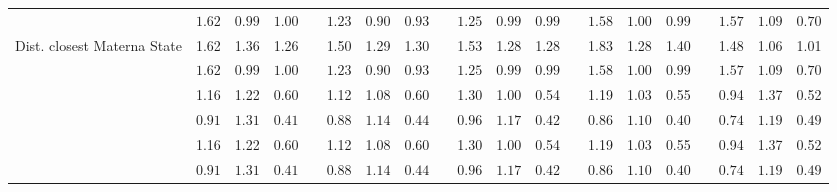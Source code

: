 \begin{center}
{\begin{longtable}{L{5cm} c c c p{.5cm} c c c p{.5cm} c c c p{.5cm} c c c p{.5cm} c c c}
& $\mathit{     1.62}$ & $\mathit{     0.99}$ & $\mathit{     1.00}$ & & $\mathit{     1.23}$ & $\mathit{     0.90}$ & $\mathit{     0.93}$ & & $\mathit{     1.25}$ & $\mathit{     0.99}$ & $\mathit{     0.99}$ & & $\mathit{     1.58}$ & $\mathit{     1.00}$ & $\mathit{     0.99}$ & & $\mathit{     1.57}$ & $\mathit{     1.09}$ & $\mathit{     0.70}$ \\[.7em]
Dist. closest Materna State & 1.62 &      1.36 &      1.26 & &      1.50 &      1.29 &      1.30 & &      1.53 &      1.28 &      1.28 & &      1.83 &      1.28 &      1.40 & &      1.48 &      1.06 &      1.01 \\*
& $\mathit{     1.62}$ & $\mathit{     0.99}$ & $\mathit{     1.00}$ & & $\mathit{     1.23}$ & $\mathit{     0.90}$ & $\mathit{     0.93}$ & & $\mathit{     1.25}$ & $\mathit{     0.99}$ & $\mathit{     0.99}$ & & $\mathit{     1.58}$ & $\mathit{     1.00}$ & $\mathit{     0.99}$ & & $\mathit{     1.57}$ & $\mathit{     1.09}$ & $\mathit{     0.70}$ \\[.7em]
 & 1.16 &      1.22 &      0.60 & &      1.12 &      1.08 &      0.60 & &      1.30 &      1.00 &      0.54 & &      1.19 &      1.03 &      0.55 & &      0.94 &      1.37 &      0.52 \\*
& $\mathit{     0.91}$ & $\mathit{     1.31}$ & $\mathit{     0.41}$ & & $\mathit{     0.88}$ & $\mathit{     1.14}$ & $\mathit{     0.44}$ & & $\mathit{     0.96}$ & $\mathit{     1.17}$ & $\mathit{     0.42}$ & & $\mathit{     0.86}$ & $\mathit{     1.10}$ & $\mathit{     0.40}$ & & $\mathit{     0.74}$ & $\mathit{     1.19}$ & $\mathit{     0.49}$ \\[.7em]
 & 1.16 &      1.22 &      0.60 & &      1.12 &      1.08 &      0.60 & &      1.30 &      1.00 &      0.54 & &      1.19 &      1.03 &      0.55 & &      0.94 &      1.37 &      0.52 \\*
& $\mathit{     0.91}$ & $\mathit{     1.31}$ & $\mathit{     0.41}$ & & $\mathit{     0.88}$ & $\mathit{     1.14}$ & $\mathit{     0.44}$ & & $\mathit{     0.96}$ & $\mathit{     1.17}$ & $\mathit{     0.42}$ & & $\mathit{     0.86}$ & $\mathit{     1.10}$ & $\mathit{     0.40}$ & & $\mathit{     0.74}$ & $\mathit{     1.19}$ & $\mathit{     0.49}$ \\[.7em]
\hline
\end{longtable}
}
\end{center}
